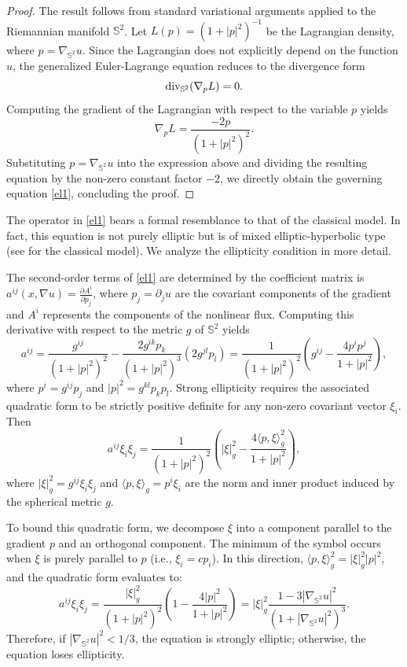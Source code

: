 \documentclass[a4paper,12pt]{amsart}
\theoremstyle{plain}
\theoremstyle{definition}
\def\s{\mathbb S}
\begin{document}
\begin{proof}The result follows from standard variational arguments applied to the Riemannian manifold $\mathbb{S}^2$. 
Let $L(p) = (1 + |p|^2)^{-1}$ be the Lagrangian density, where $p = \nabla_{\mathbb{S}^2} u$. Since the Lagrangian does not explicitly depend on the function $u$, the generalized Euler-Lagrange equation reduces to the  divergence form
\begin{equation*}
    {\rm div}_{\mathbb{S}^2} (\nabla_p L) = 0.
\end{equation*}
Computing the gradient of the Lagrangian with respect to the variable $p$ yields
\begin{equation*}
    \nabla_p L = \frac{-2p}{(1 + |p|^2)^2}.
\end{equation*}
Substituting $p = \nabla_{\mathbb{S}^2} u$ into the expression above and dividing the resulting equation by the non-zero constant factor $-2$, we directly obtain the governing equation \eqref{el1}, concluding the proof.
\end{proof}

The operator in \eqref{el1} bears a formal resemblance to that of the classical model. In fact, this equation is not purely elliptic but is of mixed elliptic-hyperbolic type (see \cite{bfk} for the classical model). We analyze the ellipticity condition in more detail. 

The second-order terms of \eqref{el1} are determined by the coefficient matrix is $a^{ij}(x, \nabla u) = \frac{\partial A^i}{\partial p_j}$, where $p_j = \partial_j u$ are the covariant components of the gradient and $A^i$ represents the components of the nonlinear flux. Computing this derivative with respect to the metric $g$ of $\s^2$ yields
$$
 a^{ij} = \frac{g^{ij}}{(1+|p|^2)^2} - \frac{2 g^{ik} p_k}{(1+|p|^2)^3} \left( 2 g^{jl} p_l \right) = \frac{1}{(1+|p|^2)^2} \left( g^{ij} - \frac{4 p^i p^j}{1+|p|^2} \right),
$$
where $p^i = g^{ij} p_j$ and $|p|^2 = g^{kl} p_k p_l$. Strong ellipticity requires the associated quadratic form to be strictly positive definite for any non-zero covariant vector $\xi_i$. Then 
$$
 a^{ij} \xi_i \xi_j = \frac{1}{(1+|p|^2)^2} \left( |\xi|^2_g - \frac{4 \langle p, \xi \rangle_g^2}{1+|p|^2} \right),
$$
where $|\xi|^2_g = g^{ij}\xi_i\xi_j$ and $\langle p, \xi \rangle_g = p^i \xi_i$ are the norm and inner product induced by the spherical metric $g$. 

To bound this quadratic form, we decompose $\xi$ into a component parallel to the gradient $p$ and an orthogonal component. The minimum of the symbol occurs when $\xi$ is purely parallel to $p$ (i.e., $\xi_i = c p_i$). In this direction, $\langle p, \xi \rangle_g^2 = |\xi|_g^2 |p|^2$, and the quadratic form evaluates to:
$$
 a^{ij} \xi_i \xi_j = \frac{|\xi|^2_g}{(1+|p|^2)^2} \left( 1 - \frac{4|p|^2}{1+|p|^2} \right) = |\xi|^2_g \frac{1 - 3|\nabla_{\mathbb{S}^2} u|^2}{(1+|\nabla_{\mathbb{S}^2} u|^2)^3}.
$$
Therefore, if $|\nabla_{\mathbb{S}^2} u|^2 < 1/3$, the equation is strongly elliptic; otherwise, the equation loses ellipticity.
 
\end{document}
